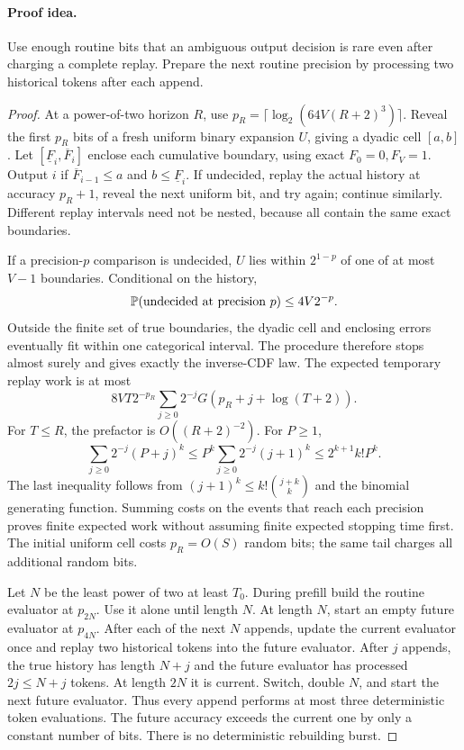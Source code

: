 \documentclass[11pt]{article}
\theoremstyle{definition}\newtheorem{definition}[theorem]{Definition}
\theoremstyle{remark}\newtheorem{remark}[theorem]{Remark}
\numberwithin{equation}{section}
\begin{document}
\paragraph{Proof idea.}
Use enough routine bits that an ambiguous output decision is rare even
after charging a complete replay. Prepare the next routine precision
by processing two historical tokens after each append.
\begin{proof}
At a power-of-two horizon $R$, use
$p_R=\lceil\log_2(64V(R+2)^3)\rceil$. Reveal the first $p_R$ bits
of a fresh uniform binary expansion $U$, giving a dyadic cell $[a,b]$.
Let $[\underline F_i,\overline F_i]$ enclose each cumulative boundary,
using exact $F_0=0,F_V=1$. Output $i$ if
$\overline F_{i-1}\le a$ and $b\le\underline F_i$. If undecided,
replay the actual history at accuracy $p_R+1$, reveal the next uniform
bit, and try again; continue similarly. Different replay intervals
need not be nested, because all contain the same exact boundaries.

If a precision-$p$ comparison is undecided, $U$ lies within $2^{1-p}$
of one of at most $V-1$ boundaries. Conditional on the history,
\begin{equation}
 \mathbb P(\text{undecided at precision }p)\le4V2^{-p}.
 \label{eq:conf-tail}
\end{equation}
Outside the finite set of true boundaries, the dyadic cell and enclosing
errors eventually fit within one categorical interval. The procedure
therefore stops almost surely and gives exactly the inverse-CDF law.
The expected temporary replay work is at most
\[
 8VT2^{-p_R}\sum_{j\ge0}2^{-j}
 G(p_R+j+\log(T+2)).
\]
For $T\le R$, the prefactor is $O((R+2)^{-2})$. For $P\ge1$,
\[
 \sum_{j\ge0}2^{-j}(P+j)^k
 \le P^k\sum_{j\ge0}2^{-j}(j+1)^k
 \le2^{k+1}k!P^k.
\]
The last inequality follows from
$(j+1)^k\le k!\binom{j+k}{k}$ and the binomial generating function.
Summing costs on the events that reach each precision proves finite
expected work without assuming finite expected stopping time first.
The initial uniform cell costs $p_R=O(S)$ random bits; the same tail
charges all additional random bits.

Let $N$ be the least power of two at least $T_0$. During prefill build
the routine evaluator at $p_{2N}$. Use it alone until length $N$.
At length $N$, start an empty future evaluator at $p_{4N}$. After each
of the next $N$ appends, update the current evaluator once and replay
two historical tokens into the future evaluator. After $j$ appends,
the true history has length $N+j$ and the future evaluator has
processed $2j\le N+j$ tokens. At length $2N$ it is current. Switch,
double $N$, and start the next future evaluator. Thus every append
performs at most three deterministic token evaluations. The future
accuracy exceeds the current one by only a constant number of bits.
There is no deterministic rebuilding burst.


\end{proof}
\end{document}
